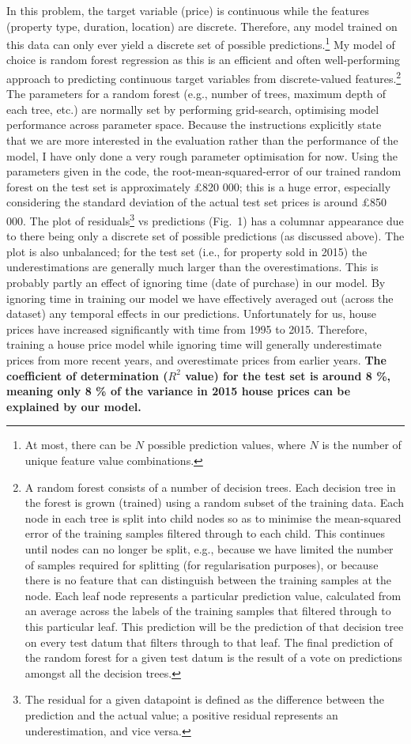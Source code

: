 \documentclass[11pt]{article} %
\begin{document}
In this problem, the target variable (price) is continuous while the features (property type, duration, location) are discrete.  Therefore, any model trained on this data can only ever yield a discrete set of possible predictions.\footnote{At most, there can be $N$ possible prediction values, where $N$ is the number of unique feature value combinations.}  My model of choice is random forest regression as this is an efficient and often well-performing approach to predicting continuous target variables from discrete-valued features.\footnote{A random forest consists of a number of decision trees.  Each decision tree in the forest is grown (trained) using a random subset of the training data.  Each node in each tree is split into child nodes so as to minimise the mean-squared error of the training samples filtered through to each child.  This continues until nodes can no longer be split, e.g., because we have limited the number of samples required for splitting (for regularisation purposes), or because there is no feature that can distinguish between the training samples at the node.  Each leaf node represents a particular prediction value, calculated from an average across the labels of the training samples that filtered through to this particular leaf.  This prediction will be the prediction of that decision tree on every test datum that filters through to that leaf.  The final prediction of the random forest for a given test datum is the result of a vote on predictions amongst all the decision trees.}  The parameters for a random forest (e.g., number of trees, maximum depth of each tree, etc.) are normally set by performing grid-search, optimising model performance across parameter space.  Because the instructions explicitly state that we are more interested in the evaluation rather than the performance of the model, I have only done a very rough parameter optimisation for now. Using the parameters given in the code, the root-mean-squared-error of our trained random forest on the test set is approximately \pounds 820 000; this is a huge error, especially considering the standard deviation of the actual test set prices is around \pounds 850 000.  The plot of residuals\footnote{The residual for a given datapoint is defined as the difference between the prediction and the actual value; a positive residual represents an underestimation, and vice versa.} vs predictions (Fig.~1) has a columnar appearance due to there being only a discrete set of possible predictions (as discussed above). The plot is also unbalanced; for the test set (i.e., for property sold in 2015) the underestimations are generally much larger than the overestimations.  This is probably partly an effect of ignoring time (date of purchase) in our model.  By ignoring time in training our model we have effectively averaged out (across the dataset) any temporal effects in our predictions.  Unfortunately for us, house prices have increased significantly with time from 1995 to 2015.  Therefore, training a  house price model while ignoring time will generally underestimate prices from more recent years, and overestimate prices from earlier years.  \textbf{The coefficient of determination ($R^2$ value) for the test set is around 8 \%, meaning only 8 \% of the variance in 2015 house prices can be explained by our model.} 
\end{document}
